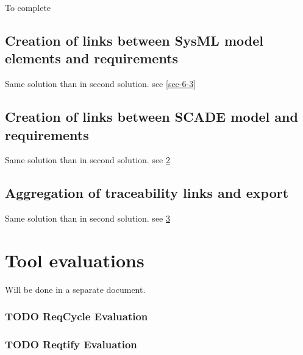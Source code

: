 \documentclass[11pt]{template/openetcs_report}
\begin{document}
To complete

\section{Creation of links between SysML model elements and requirements}
\label{sec-7-3}
Same solution than in second solution. see \ref{sec-6-3}

\section{Creation of links between SCADE model and requirements}
\label{sec-6-4}
Same solution than in second solution. see \ref{sec-6-4}

\section{Aggregation of traceability links and export}
\label{sec-6-5}
Same solution than in second solution. see \ref{sec-6-5}



\chapter{Tool evaluations}
Will be done in a separate document.
\subsection{{\bfseries\sffamily TODO} ReqCycle  Evaluation}
\label{sec-4-5}
\subsection{{\bfseries\sffamily TODO} Reqtify Evaluation}
\label{sec-4-6}



\end{document}
